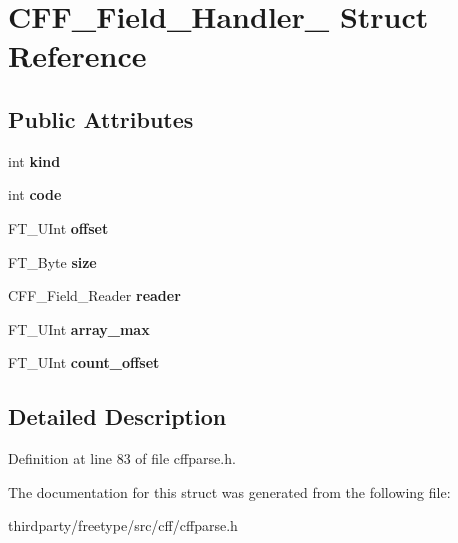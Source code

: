 \hypertarget{struct_c_f_f___field___handler__}{}\section{C\+F\+F\+\_\+\+Field\+\_\+\+Handler\+\_\+ Struct Reference}
\label{struct_c_f_f___field___handler__}
\subsection*{Public Attributes}
\begin{DoxyCompactItemize}
\item 
\mbox{\label{struct_c_f_f___field___handler___a403fb3788882055e63849c1ca1e9c959}} 
int {\bfseries kind}
\item 
\mbox{\label{struct_c_f_f___field___handler___a70d4178039c2720da08822f380ec31c8}} 
int {\bfseries code}
\item 
\mbox{\label{struct_c_f_f___field___handler___a2a24a83aa90f7b2d7d64673d75c3d1fe}} 
F\+T\+\_\+\+U\+Int {\bfseries offset}
\item 
\mbox{\label{struct_c_f_f___field___handler___a71f4b89974c9741133df19ac89383f46}} 
F\+T\+\_\+\+Byte {\bfseries size}
\item 
\mbox{\label{struct_c_f_f___field___handler___aedbe5049d545a2fe7202fe1c62bb7bc1}} 
C\+F\+F\+\_\+\+Field\+\_\+\+Reader {\bfseries reader}
\item 
\mbox{\label{struct_c_f_f___field___handler___afc53c326b89889c447466043a189bc25}} 
F\+T\+\_\+\+U\+Int {\bfseries array\+\_\+max}
\item 
\mbox{\label{struct_c_f_f___field___handler___a4d11ee0a1da61c08d58144f9ec8fc6af}} 
F\+T\+\_\+\+U\+Int {\bfseries count\+\_\+offset}
\end{DoxyCompactItemize}


\subsection{Detailed Description}


Definition at line 83 of file cffparse.\+h.



The documentation for this struct was generated from the following file\+:\begin{DoxyCompactItemize}
\item 
thirdparty/freetype/src/cff/cffparse.\+h\end{DoxyCompactItemize}
